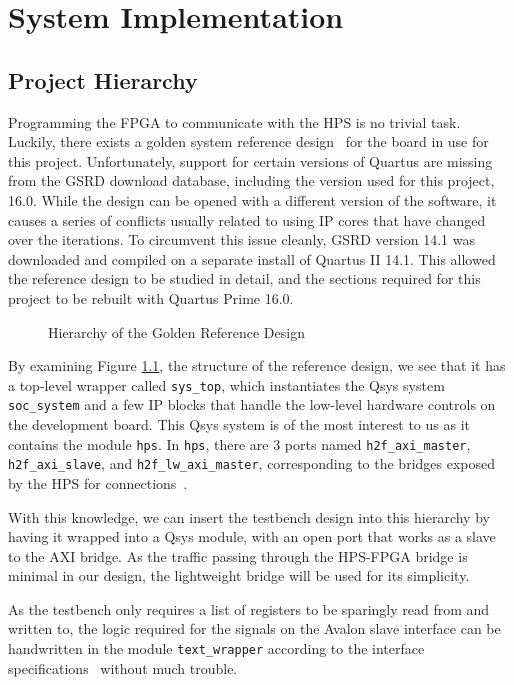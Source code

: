 \chapter{System Implementation}

\section{Project Hierarchy}
Programming the FPGA to communicate with the HPS is no trivial task.
Luckily, there exists a golden system reference design~\cite{Rocket1} for the board in use for this project.
Unfortunately, support for certain versions of Quartus are missing from the GSRD download database, including the version used for this project, 16.0.
While the design can be opened with a different version of the software, it causes a series of conflicts usually related to using IP cores that have changed over the iterations.
To circumvent this issue cleanly, GSRD version 14.1 was downloaded and compiled on a separate install of Quartus II 14.1.
This allowed the reference design to be studied in detail, and the sections required for this project to be rebuilt with Quartus Prime 16.0.

\begin{figure}[H]
  \centering
  
  \caption{Hierarchy of the Golden Reference Design}
  \label{Golden Hierarchy}
\end{figure}

By examining Figure \ref{Golden Hierarchy}, the structure of the reference design, we see that it has a top-level wrapper called \texttt{sys\_top}, which instantiates the Qsys system \texttt{soc\_system} and a few IP blocks that handle the low-level hardware controls on the development board.
This Qsys system is of the most interest to us as it contains the module \texttt{hps}.
In \texttt{hps}, there are 3 ports named \texttt{h2f\_axi\_master}, \texttt{h2f\_axi\_slave}, and \texttt{h2f\_lw\_axi\_master}, corresponding to the bridges exposed by the HPS for connections~\cite{Altera6}.

With this knowledge, we can insert the testbench design into this hierarchy by having it wrapped into a Qsys module, with an open port that works as a slave to the AXI bridge.
As the traffic passing through the HPS-FPGA bridge is minimal in our design, the lightweight bridge will be used for its simplicity.

As the testbench only requires a list of registers to be sparingly read from and written to, the logic required for the signals on the Avalon slave interface can be handwritten in the module \texttt{text\_wrapper} according to the interface specifications~\cite{Intel3} without much trouble.

